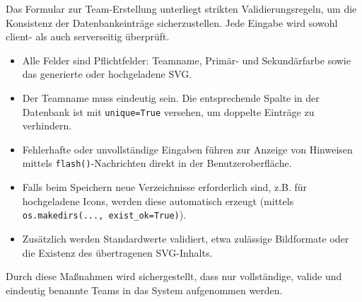 \documentclass[12pt]{article}
\begin{document}
Das Formular zur Team-Erstellung unterliegt strikten Validierungsregeln, um die Konsistenz der Datenbankeinträge sicherzustellen. Jede Eingabe wird sowohl client- als auch serverseitig überprüft.

\begin{itemize}
  \item Alle Felder sind Pflichtfelder: Teamname, Primär- und Sekundärfarbe sowie das generierte oder hochgeladene SVG.
  \item Der Teamname muss eindeutig sein. Die entsprechende Spalte in der Datenbank ist mit \texttt{unique=True} versehen, um doppelte Einträge zu verhindern.
  \item Fehlerhafte oder unvollständige Eingaben führen zur Anzeige von Hinweisen mittels \texttt{flash()}-Nachrichten direkt in der Benutzeroberfläche.
  \item Falls beim Speichern neue Verzeichnisse erforderlich sind, z.B. für hochgeladene Icons, werden diese automatisch erzeugt (mittels \texttt{os.makedirs(..., exist\_ok=True)}).
  \item Zusätzlich werden Standardwerte validiert, etwa zulässige Bildformate oder die Existenz des übertragenen SVG-Inhalts.
\end{itemize}

\noindent Durch diese Maßnahmen wird sichergestellt, dass nur vollständige, valide und eindeutig benannte Teams in das System aufgenommen werden.
\end{document}
